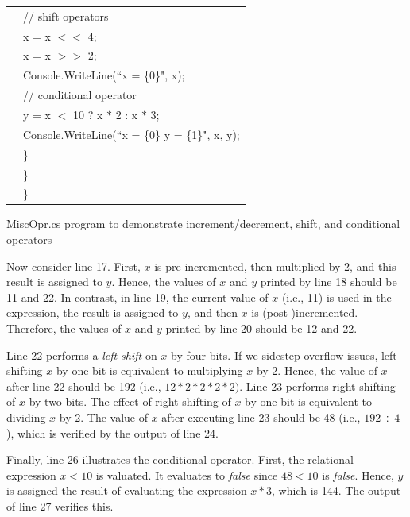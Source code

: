 \begin{program}
\begin{tabular}{>{\codelinenumfont}l>{\codelistingfont}l}
21 &  \hspace{0.6in} // shift operators\\
22 &  \hspace{0.6in} x = x $<\!<$ 4;\\
23 &  \hspace{0.6in} x = x $>\!>$ 2;\\
24 &  \hspace{0.6in} Console.WriteLine(``x = \{0\}", x);\\

25 &  \hspace{0.6in} // conditional operator\\
26 &  \hspace{0.6in} y = x $<$ 10 ? x $\ast$ 2 : x $\ast$ 3;\\
27 &  \hspace{0.6in} Console.WriteLine(``x = \{0\}  y = \{1\}", x, y);\\
28 & \hspace{0.4in} \} \\
29 & \hspace{0.2in} \} \\
30 & \} \\

\end{tabular}
\caption{MiscOpr.cs program to demonstrate increment/decrement,
shift, and conditional operators} \label{tab:MiscOpr}
\end{program}
\renewcommand{\baselinestretch}{1.0}


Now consider line 17. First, $x$ is pre-incremented, then
multiplied by 2, and this result is assigned to $y$. Hence, the
values of $x$ and $y$ printed by line 18 should be 11 and 22. In
contrast, in line 19, the current value of $x$ (i.e., 11) is used
in the expression, the result is assigned to $y$, and then $x$ is
(post-)incremented. Therefore, the values of $x$ and $y$ printed
by line 20 should be 12 and 22.

Line 22 performs a \emph{left shift} on $x$ by four bits. If we
sidestep overflow issues, left shifting $x$ by one bit is
equivalent to multiplying $x$ by 2. Hence, the value of $x$ after
line 22 should be 192 (i.e., $12 \ast 2 \ast 2 \ast 2 \ast 2)$.
Line 23 performs right shifting of $x$ by two bits. The effect of
right shifting of $x$ by one bit is equivalent to dividing $x$ by
2. The value of $x$ after executing line 23 should be 48 (i.e.,
$192 \div 4$), which is verified by the output of line 24.

Finally, line 26 illustrates the conditional operator. First, the
relational expression $x < 10$ is valuated. It evaluates to
\emph{false} since $48 < 10$ is \emph{false}. Hence, $y$ is
assigned the result of evaluating the expression $x \ast 3$, which
is 144. The output of line 27 verifies this.


